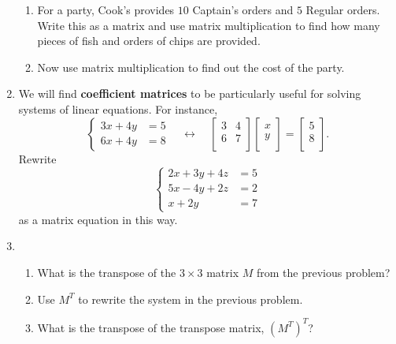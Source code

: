 \documentclass[../gatm.tex]{subfiles}
\begin{document}
\begin{enumerate}
\begin{enumerate}
\item For a party, Cook's provides $10$ Captain's orders and $5$ Regular orders. Write this as a matrix and use matrix multiplication to find how many pieces of fish and orders of chips are provided.
\item Now use matrix multiplication to find out the cost of the party.
\end{enumerate}
\item We will find \textbf{coefficient matrices} to be particularly useful for solving systems of linear equations. For instance, $$\begin{cases}3x+4y&=5 \\ 6x+4y &= 8\end{cases}\quad\longleftrightarrow\quad\left[\begin{array}{cc} 3 & 4 \\ 6 & 7 \\ \end{array}\right]\left[\begin{array}{c} x \\ y \\ \end{array}\right]=\left[\begin{array}{c} 5 \\ 8 \\ \end{array}\right].$$ Rewrite $$\begin{cases}2x+3y+4z&=5 \\ 5x-4y+2z &= 2 \\ x+2y &= 7\end{cases}$$ as a matrix equation in this way.
\item \begin{enumerate}
\item What is the transpose of the $3\times 3$ matrix $M$ from the previous problem?
\item Use $M^T$ to rewrite the system in the previous problem.
\item What is the transpose of the transpose matrix, $(M^T)^T$?
\end{enumerate}
\end{enumerate}
\end{document}
